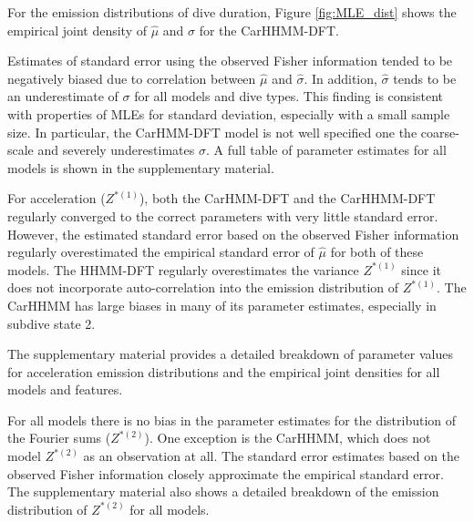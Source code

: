 For the emission distributions of dive duration, Figure \ref{fig:MLE_dist} shows the empirical joint density of $\hat \mu$ and $\hat \sigma$ for the CarHHMM-DFT.

Estimates of standard error using the observed Fisher information tended to be negatively biased due to correlation between $\hat \mu$ and $\hat \sigma$. In addition, $\hat \sigma$ tends to be an underestimate of $\sigma$ for all models and dive types. This finding is consistent with properties of MLEs for standard deviation, especially with a small sample size. In particular, the CarHMM-DFT model is not well specified one the coarse-scale and severely underestimates $\sigma$. %
A full table of parameter estimates for all models is shown in the supplementary material.


For acceleration ($Z^{*(1)}$), both the CarHMM-DFT and the CarHHMM-DFT regularly converged to the correct parameters with very little standard error. However, the estimated standard error based on the observed Fisher information regularly overestimated the empirical standard error of $\hat \mu$ for both of these models. 
The HHMM-DFT regularly overestimates the variance $Z^{*(1)}$ since it does not incorporate auto-correlation into the emission distribution of $Z^{*(1)}$. The CarHHMM has large biases in many of its parameter estimates, especially in subdive state 2. 

The supplementary material provides a detailed breakdown of parameter values for acceleration emission distributions and the empirical joint densities for all models and features.

For all models there is no bias in the parameter estimates for the distribution of the Fourier sums ($Z^{*(2)}$). One exception is the CarHHMM, which does not model $Z^{*(2)}$ as an observation at all. The standard error estimates based on the observed Fisher information closely approximate the empirical standard error.
The supplementary material also shows a detailed breakdown of the emission distribution of $Z^{*(2)}$ for all models.

